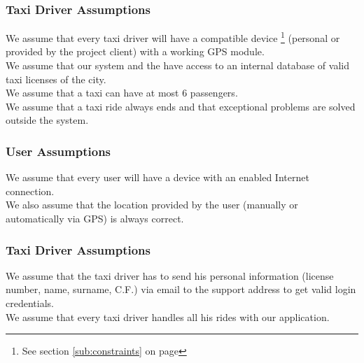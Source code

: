 \subsubsection{Taxi Driver Assumptions} 
We assume that every taxi driver will have a compatible device  \footnote{See section \ref{sub:constraints} on page \pageref{sub:constraints}} (personal or provided by the project client) with a working GPS module.\\
We assume that our system and the \emph{} have access to an internal database of valid taxi licenses of the city.\\
We assume that a taxi can have at most 6 passengers.\\
We assume that a taxi ride always ends and that exceptional problems are solved outside the system.
\subsubsection{User Assumptions} 
\label{ssub:user_assumptions}
We assume that every user will have a device with an enabled Internet connection.\\
We also assume that the location provided by the user (manually or automatically via GPS) is always correct.
\subsubsection{Taxi Driver Assumptions} 
\label{ssub:driver_assumptions}
We assume that the taxi driver has to send his personal information (license number, name, surname, C.F.) via email to the support address to get valid login credentials.\\ 
We assume that every taxi driver handles all his rides with our application.

